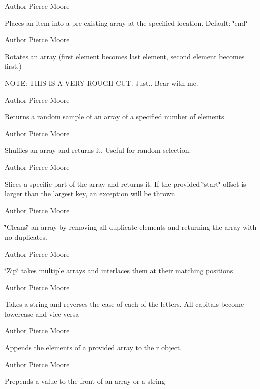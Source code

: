 \begin{DoxyAuthor}{Author}
Pierce Moore
\end{DoxyAuthor}
Places an item into a pre-\/existing array at the specified location. Default\-: \char`\"{}end\char`\"{}

\begin{DoxyAuthor}{Author}
Pierce Moore
\end{DoxyAuthor}
Rotates an array (first element becomes last element, second element becomes first.)

N\-O\-T\-E\-: T\-H\-I\-S I\-S A V\-E\-R\-Y R\-O\-U\-G\-H C\-U\-T. Just.. Bear with me.

\begin{DoxyAuthor}{Author}
Pierce Moore
\end{DoxyAuthor}
Returns a random sample of an array of a specified number of elements.

\begin{DoxyAuthor}{Author}
Pierce Moore
\end{DoxyAuthor}
Shuffles an array and returns it. Useful for random selection.

\begin{DoxyAuthor}{Author}
Pierce Moore
\end{DoxyAuthor}
Slices a specific part of the array and returns it. If the provided \char`\"{}start\char`\"{} offset is larger than the largest key, an exception will be thrown.

\begin{DoxyAuthor}{Author}
Pierce Moore
\end{DoxyAuthor}
\char`\"{}\-Cleans\char`\"{} an array by removing all duplicate elements and returning the array with no duplicates.

\begin{DoxyAuthor}{Author}
Pierce Moore
\end{DoxyAuthor}
\char`\"{}\-Zip\char`\"{} takes multiple arrays and interlaces them at their matching positions

\begin{DoxyAuthor}{Author}
Pierce Moore
\end{DoxyAuthor}
Takes a string and reverses the case of each of the letters. All capitals become lowercase and vice-\/versa

\begin{DoxyAuthor}{Author}
Pierce Moore
\end{DoxyAuthor}
Appends the elements of a provided array to the r object.

\begin{DoxyAuthor}{Author}
Pierce Moore
\end{DoxyAuthor}
Prepends a value to the front of an array or a string

